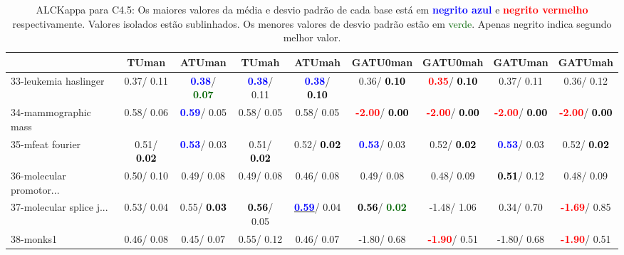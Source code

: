 \begin{table}[h]
\caption{ALCKappa para C4.5: Os maiores valores da média e desvio padrão de cada base está em \textcolor{blue}{\textbf{negrito azul}} e \textcolor{red}{\textbf{negrito vermelho}} respectivamente. Valores isolados estão sublinhados. Os menores valores de desvio padrão estão em \textcolor{darkgreen}{verde}. Apenas negrito indica segundo melhor valor.}
\begin{center}\begin{tabular}{lc|c|c|c|c|c|c|c}
 & TUman & \textbf{ATUman} & TUmah & \textbf{ATUmah} & GATU0man & GATU0mah & GATUman & GATUmah\\ \hline 33-leukemia haslinger &   0.37/  0.11 & \textcolor{blue}{\textbf{  0.38}}/\textcolor{darkgreen}{\textbf{  0.07}} & \textcolor{blue}{\textbf{  0.38}}/  0.11 & \textcolor{blue}{\textbf{  0.38}}/\textcolor{black}{\textbf{  0.10}} &   0.36/\textcolor{black}{\textbf{  0.10}} & \textcolor{red}{\textbf{  0.35}}/\textcolor{black}{\textbf{  0.10}} &   0.37/  0.11 &   0.36/  0.12 \\
34-mammographic mass &   0.58/  0.06 & \textcolor{blue}{\textbf{  0.59}}/  0.05 &   0.58/  0.05 &   0.58/  0.05 & \textcolor{red}{\textbf{ -2.00}}/\textcolor{black}{\textbf{  0.00}} & \textcolor{red}{\textbf{ -2.00}}/\textcolor{black}{\textbf{  0.00}} & \textcolor{red}{\textbf{ -2.00}}/\textcolor{black}{\textbf{  0.00}} & \textcolor{red}{\textbf{ -2.00}}/\textcolor{black}{\textbf{  0.00}} \\
35-mfeat fourier &   0.51/\textcolor{black}{\textbf{  0.02}} & \textcolor{blue}{\textbf{  0.53}}/  0.03 &   0.51/\textcolor{black}{\textbf{  0.02}} &   0.52/\textcolor{black}{\textbf{  0.02}} & \textcolor{blue}{\textbf{  0.53}}/  0.03 &   0.52/\textcolor{black}{\textbf{  0.02}} & \textcolor{blue}{\textbf{  0.53}}/  0.03 &   0.52/\textcolor{black}{\textbf{  0.02}} \\
36-molecular promotor... &   0.50/  0.10 &   0.49/  0.08 &   0.49/  0.08 &   0.46/  0.08 &   0.49/  0.08 &   0.48/  0.09 & \textcolor{black}{\textbf{  0.51}}/  0.12 &   0.48/  0.09 \\
37-molecular splice j... &   0.53/  0.04 &   0.55/\textcolor{black}{\textbf{  0.03}} & \textcolor{black}{\textbf{  0.56}}/  0.05 & \underline{\textcolor{blue}{\textbf{  0.59}}}/  0.04 & \textcolor{black}{\textbf{  0.56}}/\textcolor{darkgreen}{\textbf{  0.02}} &  -1.48/  1.06 &   0.34/  0.70 & \textcolor{red}{\textbf{ -1.69}}/  0.85 \\
38-monks1 &   0.46/  0.08 &   0.45/  0.07 &   0.55/  0.12 &   0.46/  0.07 &  -1.80/  0.68 & \textcolor{red}{\textbf{ -1.90}}/  0.51 &  -1.80/  0.68 & \textcolor{red}{\textbf{ -1.90}}/  0.51 \\

\end{tabular}
\end{center}
\end{table}
